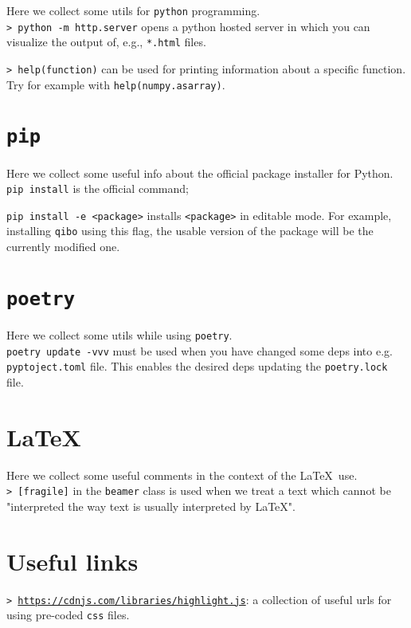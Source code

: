 \documentclass[11pt]{article}
\newcommand{\cmd}[1]{\colorbox{light-gray}{\textcolor{gio}{\texttt{#1}}}}
\begin{document}
\begin{multicols}{2}
Here we collect some utils for \texttt{python} programming. \\

\cmd{> python -m http.server} opens a python hosted server in which you can 
visualize the output of, e.g., \texttt{*.html} files.

\cmd{> help(function)} can be used for printing information about a specific 
function.
Try for example with \texttt{help(numpy.asarray)}.

\section{\texttt{pip}}

Here we collect some useful info about the official  package installer for Python. \\

\cmd{pip install} is the official command;

\cmd{pip install -e <package>} installs \texttt{<package>} in editable mode. 
For example, installing \texttt{qibo} using this flag, the usable version of the 
package will be the currently modified one.

\section{\texttt{poetry}}

Here we collect some utils while using \texttt{poetry}. \\

\cmd{poetry update -vvv} must be used when you have changed some deps into e.g. 
\texttt{pyptoject.toml} file. This enables the desired deps updating the 
\texttt{poetry.lock} file.

\section{\LaTeX}

Here we collect some useful comments in the context of the \LaTeX$\,$ use. \\

\cmd{> [fragile]} in the \texttt{beamer} class is used when we treat a text which 
cannot be "interpreted the way text is usually interpreted by \LaTeX".


\newpage

\section*{Useful links}

\cmd{> \href{https://cdnjs.com/libraries/highlight.js}{https://cdnjs.com/libraries/highlight.js}}:
 a collection of useful urls for using pre-coded \texttt{css} files.

\newpage
\end{multicols}
\end{document}
